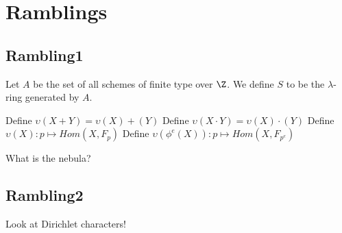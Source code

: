 
\section{Ramblings}

\subsection{Rambling1}

Let $A$ be the set of all schemes of finite type over $\Z$. We define $S$ to be the $\lambda$-ring generated by $A$. 

Define $\upsilon(X + Y) = \upsilon(X) + (Y)$
Define $\upsilon(X \cdot Y) = \upsilon(X) \cdot (Y)$
Define $\upsilon(X) : p \mapsto Hom(X, F_p)$
Define $\upsilon(\phi^e(X)) : p \mapsto Hom(X, F_{p^e})$

What is the nebula?


\subsection{Rambling2}

Look at Dirichlet characters!
